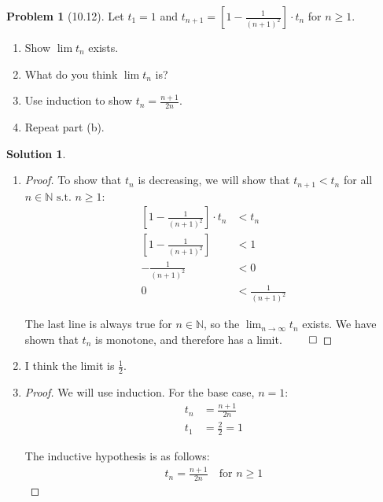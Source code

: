 \documentclass[12pt]{article}
\theoremstyle{definition} %
\newtheorem{solution}{Solution}
\newtheorem{problem}{Problem}
\theoremstyle{plain} %
\begin{document}
\begin{problem}[10.12]
    Let $t_1 = 1$ and $t_{n+1} = \left[1 - \frac{1}{(n+1)^2}\right] \cdot t_n$ for $n \geq 1$.
    \begin{enumerate}[label=(\alph*)]
        \item Show $\lim t_n$ exists.
        \item What do you think $\lim t_n$ is?
        \item Use induction to show $t_n = \frac{n+1}{2n}$.
        \item Repeat part (b).
    \end{enumerate}
\end{problem}

\begin{solution}
    \begin{enumerate}
        \item \begin{proof}
            To show that $t_n$ is decreasing, we will show that $t_{n+1} < t_n$ for all $n \in \mathbb{N} \text{ s.t. } n \geq 1$:
            \begin{align}
                \left[1 - \frac{1}{(n+1)^2}\right] \cdot t_n &< t_n \tag{66} \\
                \left[1 - \frac{1}{(n+1)^2}\right] &< 1 \tag{67} \\
                -\frac{1}{(n+1)^2} &< 0 \tag{68} \\
                0 &< \frac{1}{(n+1)^2} \tag{69}
            \end{align}
        
            The last line is always true for $n \in \mathbb{N}$, so the $\lim_{n \to \infty} t_n$ exists. We have shown that $t_n$ is monotone, and therefore has a limit. $\qed$
        \end{proof}
        \item I think the limit is $\frac{1}{2}$.
        \item \begin{proof}
            We will use induction. For the base case, $n = 1$:
            \begin{align}
                t_n &= \frac{n + 1}{2n} \tag{70} \\
                t_1 &= \frac{2}{2} = 1 \tag{71}
            \end{align}
        
            The inductive hypothesis is as follows:
            \begin{align}
            t_n = \frac{n + 1}{2n} \quad \text{for } n \geq 1 \tag{72}
            \end{align}
        

\end{proof}
\end{enumerate}
\end{solution}
\end{document}
